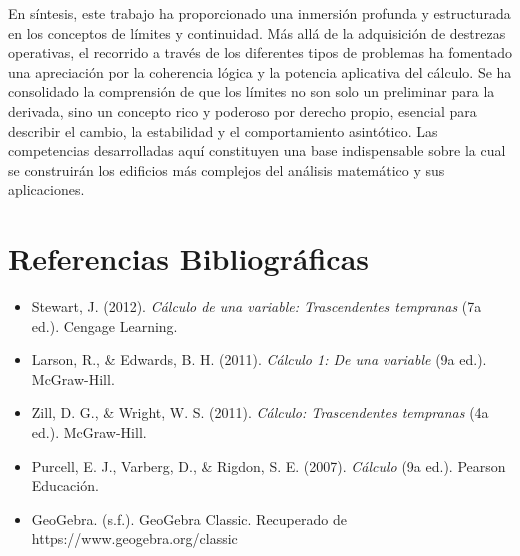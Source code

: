 \documentclass{article}
\begin{document}
En síntesis, este trabajo ha proporcionado una inmersión profunda y estructurada en los conceptos de límites y continuidad. Más allá de la adquisición de destrezas operativas, el recorrido a través de los diferentes tipos de problemas ha fomentado una apreciación por la coherencia lógica y la potencia aplicativa del cálculo. Se ha consolidado la comprensión de que los límites no son solo un preliminar para la derivada, sino un concepto rico y poderoso por derecho propio, esencial para describir el cambio, la estabilidad y el comportamiento asintótico. Las competencias desarrolladas aquí constituyen una base indispensable sobre la cual se construirán los edificios más complejos del análisis matemático y sus aplicaciones.

\newpage

\section*{Referencias Bibliográficas}

\begin{itemize}
    \item[] Stewart, J. (2012). \textit{Cálculo de una variable: Trascendentes tempranas} (7a ed.). Cengage Learning.
    \item[] Larson, R., \& Edwards, B. H. (2011). \textit{Cálculo 1: De una variable} (9a ed.). McGraw-Hill.
    \item[] Zill, D. G., \& Wright, W. S. (2011). \textit{Cálculo: Trascendentes tempranas} (4a ed.). McGraw-Hill.
    \item[] Purcell, E. J., Varberg, D., \& Rigdon, S. E. (2007). \textit{Cálculo} (9a ed.). Pearson Educación.
    \item[] GeoGebra. (s.f.). GeoGebra Classic. Recuperado de https://www.geogebra.org/classic
\end{itemize}
\end{document}
